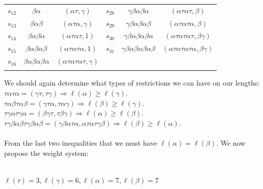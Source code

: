 \documentclass[11pt]{amsart}
\theoremstyle{definition}
\theoremstyle{remark}
\numberwithin{equation}{section}
\begin{document}
{\begin{tabular}{ c | c | c | c | c | c}
  $s_{12}$ & $\beta \alpha$ & $(\alpha \tau, \gamma)$ & $s_{28}$ & $\gamma \beta \alpha \beta \alpha$ & $(\alpha \tau \alpha \tau, \beta)$  \\
  $s_{13}$ & $\beta \alpha \beta$ & $(\alpha \tau \alpha, \gamma)$ & $s_{29}$ & $\gamma \beta \alpha \beta \alpha \beta$ & $(\alpha \tau \alpha \tau \alpha, \beta)$ \\
  $s_{14}$ & $\beta \alpha \beta \alpha$ & $(\alpha \tau \alpha \tau, 1)$ & $s_{30}$ &  $\gamma \beta \alpha \beta \alpha \beta \alpha$ & $(\alpha \tau \alpha \tau \alpha \tau, \beta \gamma)$  \\
  $s_{15}$ & $\beta \alpha \beta \alpha \beta$ & $(\alpha \tau \alpha \tau \alpha, 1)$ & $s_{31}$ & $\gamma \beta \alpha \beta \alpha \beta \alpha \beta$ & $(\alpha \tau \alpha \tau \alpha \tau \alpha, \beta \gamma)$ \\
  $s_{16}$ & $\beta \alpha \beta \alpha \beta \alpha$ & $(\alpha \tau \alpha \tau \alpha \tau, \gamma)$ \\
 \\   
\end{tabular}
}
\vspace{5mm}
\noindent We should again determine what types of restrictions we can have on our lengths: \\ 
\hspace*{50 mm}$\tau \alpha \tau \alpha = (\gamma \tau, \tau \gamma) \Rightarrow \ell(\alpha) \geq \ell(\gamma)$. \\
\hspace*{50 mm}$\tau \alpha \beta \tau \alpha \beta = ( \gamma \tau \alpha, \tau \alpha \gamma) \Rightarrow \ell(\beta) \geq \ell(\gamma)$. \\
\hspace*{50 mm}$ \tau \gamma \alpha \tau \gamma \alpha = (\beta \gamma \tau, \tau \beta \gamma) \Rightarrow \ell(\alpha) \geq \ell(\beta)$. \\
\hspace*{50 mm}$ \tau \gamma \beta \alpha \beta \tau \gamma \beta \alpha \beta = (\gamma \beta \alpha \tau \alpha, \alpha \tau \alpha \tau \gamma \beta) \Rightarrow \ell(\beta) \geq \ell(\alpha)$. \\ \\
\noindent From the last two inequalities that we must have $\ell(\alpha) = \ell(\beta)$. We now propose the weight system: \\ \\ 
\centerline{$\ell(\tau) = 3, \ell(\gamma) = 6, \ell(\alpha) = 7, \ell(\beta) = 7$} \\ \\
\end{document}
